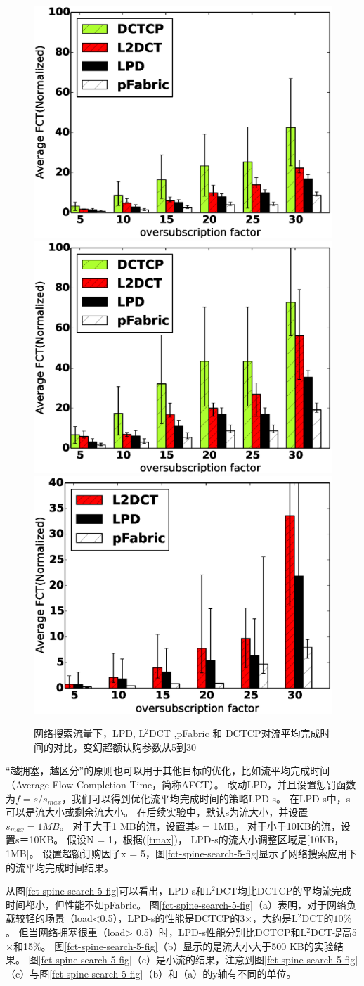 \begin{figure}[h]
\centering
{}
 {\includegraphics[width=0.32\columnwidth]{figures/LPD/spineleaf/average_fct.eps}}
{\includegraphics[width=0.32\columnwidth]{figures/LPD/spineleaf/large_fct.eps}}
{\includegraphics[width=0.32\columnwidth]{figures/LPD/spineleaf/small_fct.eps}}
\caption{网络搜索流量下，LPD, L$^2$DCT ,pFabric 和 DCTCP对流平均完成时间的对比，变幻超额认购参数从5到30}
\label{fct-spine-fct-factor-fig}
\end{figure}


“越拥塞，越区分”的原则也可以用于其他目标的优化，比如流平均完成时间（Average Flow Completion Time，简称AFCT）。
改动LPD，并且设置惩罚函数为$f = s / s_{max}$，我们可以得到优化流平均完成时间的策略LPD-s。
在LPD-s中，s可以是流大小或剩余流大小。
在后续实验中，默认s为流大小，并设置$s_{max} = 1MB$。
对于大于1 MB的流，设置其s = 1MB。
对于小于10KB的流，设置s＝10KB。
假设N = 1，根据(\ref{tmax})，
LPD-s的流大小调整区域是[10KB，1MB]。
设置超额订购因子x = 5，图\ref{fct-spine-search-5-fig}显示了网络搜索应用下的流平均完成时间结果。


从图\ref{fct-spine-search-5-fig}可以看出，LPD-s和L$^2$DCT均比DCTCP的平均流完成时间都小，但性能不如pFabric。
图\ref{fct-spine-search-5-fig}（a）表明，对于网络负载较轻的场景（load<0.5），LPD-s的性能是DCTCP的3$\times$，大约是L$^2$DCT的$10\%$。
但当网络拥塞很重（load> 0.5）时，LPD-s性能分别比DCTCP和L$^2$DCT提高5$\times$和15$\%$。
图\ref{fct-spine-search-5-fig}（b）显示的是流大小大于500 KB的实验结果。
图\ref{fct-spine-search-5-fig}（c）是小流的结果，注意到图\ref{fct-spine-search-5-fig}（c）与图\ref{fct-spine-search-5-fig}（b）和（a）的y轴有不同的单位。


